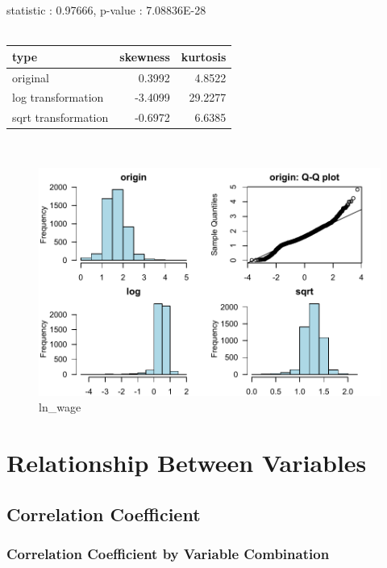 \documentclass{book}\usepackage[]{graphicx}\usepackage[]{color}
\begin{document}
\noindent statistic : 0.97666,  p-value : 7.08836E-28\\
\\%
\begin{tabular}{lrr}
  \toprule
type & skewness & kurtosis \\ 
  \midrule
original & 0.3992 & 4.8522 \\ 
  log transformation & -3.4099 & 29.2277 \\ 
  sqrt transformation & -0.6972 & 6.6385 \\ 
   \bottomrule
\end{tabular}
\\
\begin{figure}[!ht]
\centering
\includegraphics[width=1.0\textwidth]{figure/norm21.pdf}
\caption{ln\_wage}
\end{figure}
\clearpage

\chapter{Relationship Between Variables}
\section{Correlation Coefficient}
\subsection{Correlation Coefficient by Variable Combination}
\end{document}
